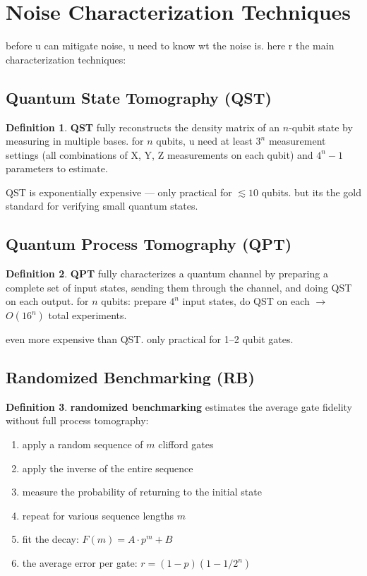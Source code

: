 \documentclass[11pt,a4paper]{article}
\theoremstyle{definition}
\newtheorem{definition}{Definition}[section]
\theoremstyle{remark}
\begin{document}
\section{Noise Characterization Techniques}

before u can mitigate noise, u need to know wt the noise is. here r the main characterization techniques:

\subsection{Quantum State Tomography (QST)}

\begin{definition}
\textbf{QST} fully reconstructs the density matrix of an $n$-qubit state by measuring in multiple bases. for $n$ qubits, u need at least $3^n$ measurement settings (all combinations of X, Y, Z measurements on each qubit) and $4^n - 1$ parameters to estimate.
\end{definition}

QST is exponentially expensive --- only practical for $\lesssim 10$ qubits. but its the gold standard for verifying small quantum states.

\subsection{Quantum Process Tomography (QPT)}

\begin{definition}
\textbf{QPT} fully characterizes a quantum channel by preparing a complete set of input states, sending them through the channel, and doing QST on each output. for $n$ qubits: prepare $4^n$ input states, do QST on each $\to$ $O(16^n)$ total experiments.
\end{definition}

even more expensive than QST. only practical for 1--2 qubit gates.

\subsection{Randomized Benchmarking (RB)}

\begin{definition}
\textbf{randomized benchmarking} estimates the average gate fidelity without full process tomography:
\begin{enumerate}
    \item apply a random sequence of $m$ clifford gates
    \item apply the inverse of the entire sequence
    \item measure the probability of returning to the initial state
    \item repeat for various sequence lengths $m$
    \item fit the decay: $F(m) = A \cdot p^m + B$
    \item the average error per gate: $r = (1-p)(1 - 1/2^n)$
\end{enumerate}
\end{definition}
\end{document}
